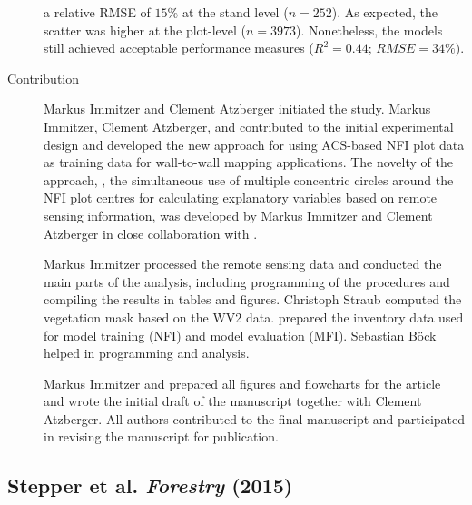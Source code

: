 \begin{description}
		a relative RMSE of $15\%$ at the stand level ($n = 252$). As expected, the scatter was higher at the plot-level
		($n = 3973$). Nonetheless, the models still achieved acceptable performance measures ($R^2 = 0.44$;
		$RMSE = 34\%$).
	\item[Contribution] Markus Immitzer and Clement Atzberger initiated the study. Markus Immitzer, Clement Atzberger, 
		and \myName contributed to the initial experimental design and developed the new approach for using \ac{ACS}-based \ac{NFI} plot data
		as training data for wall-to-wall mapping applications. The novelty of the approach, \ie, the simultaneous use of
		multiple concentric circles around the \ac{NFI} plot centres for calculating explanatory variables based on remote sensing information,
		was developed by Markus Immitzer and Clement Atzberger in close collaboration with \myName.
		
		Markus Immitzer processed the remote sensing data and conducted the main parts of the analysis,
		including programming of the procedures and compiling the results in tables and figures.
		Christoph Straub computed the vegetation mask based on the \ac{WV2} data.
		\myName prepared the inventory data used for model training (\acs{NFI}) and model evaluation (\acs{MFI}). 
		Sebastian Böck helped in programming and analysis.
	
		Markus Immitzer and \myName prepared all figures and flowcharts for the article and 
		wrote the initial draft of the manuscript together with Clement Atzberger.
		All authors contributed to the final manuscript and participated in revising the manuscript for publication.
	
\end{description}


\subsection[Stepper et al. \emph{Forestry} (2015)]
{Stepper et al.\; 
	\emph{Forestry}
	(2015) }
\label{sec:pub.Forestry2015}

